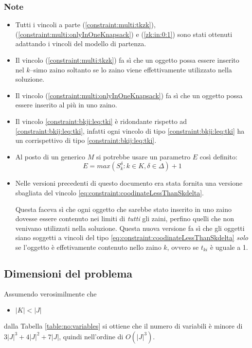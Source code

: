 \subsubsection{Note}
\begin{itemize}
\item Tutti i vincoli a parte (\ref{constraint:multi:tkzk}), 
(\ref{constraint:multi:onlyInOneKnapsack}) e (\ref{zk:in:0:1}) sono stati 
ottenuti adattando i vincoli del modello di partenza.
\item Il vincolo (\ref{constraint:multi:tkzk}) fa sì che un oggetto possa essere
 inserito nel $k$--simo zaino soltanto se lo zaino viene effettivamente 
 utilizzato nella soluzione.
\item Il vincolo (\ref{constraint:multi:onlyInOneKnapsack}) fa sì che un oggetto
possa essere inserito al più in uno zaino. 
\item Il vincolo \ref{constraint:bkji:leq:tki} è ridondante rispetto ad 
\ref{constraint:bkij:leq:tki}, infatti ogni vincolo di tipo
\ref{constraint:bkji:leq:tki} ha un corrispettivo di tipo 
\ref{constraint:bkij:leq:tki}.
\item Al posto di un generico $M$ si potrebbe usare un 
parametro $E$ così definito:
$$
E = max(S_k^\delta : k \in K, \delta \in \Delta) + 1
$$ 
\item Nelle versioni precedenti di questo documento era stata fornita una
versione sbagliata del vincolo \ref{eq:constraint:coodinateLessThanSkdelta}.

Questa faceva sì che ogni oggetto che sarebbe stato inserito in uno zaino 
dovesse essere contenuto nei limiti di \emph{tutti} gli zaini, perfino
quelli che non venivano utilizzati nella soluzione.
Questa nuova versione fa sì che gli oggetti siano soggetti a vincoli
del tipo \ref{eq:constraint:coodinateLessThanSkdelta} \emph{solo}
se l'oggetto è effetivamente contenuto nello zaino $k$, ovvero se 
$t_{ki}$ è uguale a 1.

\end{itemize}


\subsection{Dimensioni del problema}
\label{sec:orig:dimensioneDelProblema}
Assumendo verosimilmente che 
\begin{itemize}
	\item $|K| < |J|$
\end{itemize}  
dalla Tabella \ref{table:no:variables}
si ottiene che il numero di variabili è minore di $3|J|^3 + 4|J|^2 + 7|J|$, 
quindi nell'ordine di $O(|J|^3)$.



